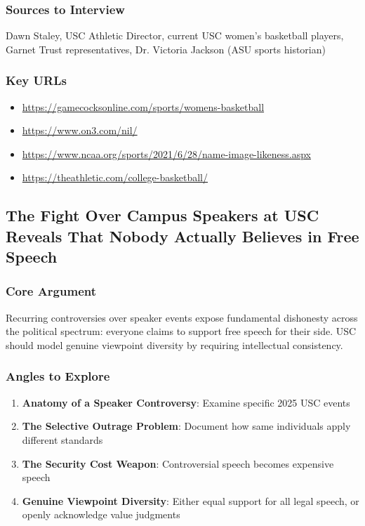 \documentclass[11pt,letterpaper]{article}
\begin{document}
\subsubsection*{Sources to Interview}
Dawn Staley, USC Athletic Director, current USC women's basketball players, Garnet Trust representatives, Dr. Victoria Jackson (ASU sports historian)

\subsubsection*{Key URLs}
\begin{itemize}[noitemsep]
    \item \url{https://gamecocksonline.com/sports/womens-basketball}
    \item \url{https://www.on3.com/nil/}
    \item \url{https://www.ncaa.org/sports/2021/6/28/name-image-likeness.aspx}
    \item \url{https://theathletic.com/college-basketball/}
\end{itemize}

\newpage
\subsection{The Fight Over Campus Speakers at USC Reveals That Nobody Actually Believes in Free Speech}

\subsubsection*{Core Argument}
Recurring controversies over speaker events expose fundamental dishonesty across the political spectrum: everyone claims to support free speech for their side. USC should model genuine viewpoint diversity by requiring intellectual consistency.

\subsubsection*{Angles to Explore}
\begin{enumerate}[noitemsep]
    \item \textbf{Anatomy of a Speaker Controversy}: Examine specific 2025 USC events
    \item \textbf{The Selective Outrage Problem}: Document how same individuals apply different standards
    \item \textbf{The Security Cost Weapon}: Controversial speech becomes expensive speech
    \item \textbf{Genuine Viewpoint Diversity}: Either equal support for all legal speech, or openly acknowledge value judgments
\end{enumerate}
\end{document}
